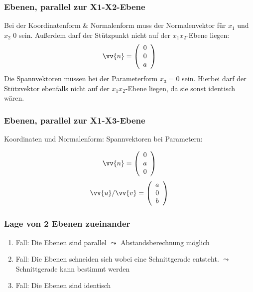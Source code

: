 \documentclass[a4paper, 15pt]{article}
\begin{document}
\subsubsection{Ebenen, parallel zur X1-X2-Ebene}
Bei der Koordinatenform \& Normalenform muss der Normalenvektor für $x_1$ und $x_2$ 0 sein. Außerdem darf der Stützpunkt nicht auf der $x_1x_2$-Ebene liegen:
\begin{equation*}
\vv{n}= \left(\begin{array}{c} 0 \\ 0 \\ a \end{array}\right)
\end{equation*}
Die Spannvektoren müssen bei der Parameterform $x_3 = 0$ sein. Hierbei darf der Stützvektor ebenfalls nicht auf der $x_1x_2$-Ebene liegen, da sie sonst identisch wären.
\newpage
\subsubsection{Ebenen, parallel zur X1-X3-Ebene}
\begin{minipage}{.49\textwidth}
Koordinaten und Normalenform:\newline
\vspace{0.7cm}\newline
Spannvektoren bei Parametern:
\end{minipage}
\begin{minipage}{.49\textwidth}
\begin{equation*}
\vv{n}= \left(\begin{array}{c} 0 \\ a \\ 0 \end{array}\right)
\end{equation*}
\begin{equation*}
\vv{u}/\vv{v}= \left(\begin{array}{c} a \\ 0 \\ b \end{array}\right)
\end{equation*}
\end{minipage}
\subsubsection{Lage von 2 Ebenen zueinander}
\begin{enumerate}
\item Fall: Die Ebenen sind parallel\newline
$\leadsto$ Abstandsberechnung möglich
\item Fall: Die Ebenen schneiden sich wobei eine Schnittgerade entsteht.\newline
$\leadsto$ Schnittgerade kann bestimmt werden
\item Fall: Die Ebenen sind identisch
\end{enumerate}
\end{document}
